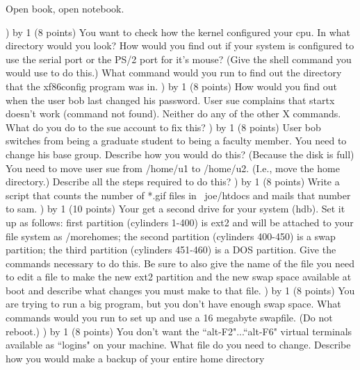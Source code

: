 
\parindent=0in
\nopagenumbers
\newcount\quesno
{}
\def\ques{\number\quesno) \advance\quesno by 1}
\def\aspace{\vskip 1.5in}

Open book, open notebook.

\ques
(8 points)
You want to check how the kernel configured your cpu.
In what directory would you look?
\vskip 0.5in
How would you find out if your system is configured to use
the serial port or the PS/2 port for it's mouse?
(Give the shell command you would use to do this.)  
\vskip 0.5in
What command would you run to find out the directory
that the {\ltt{}xf86config} program was in.
\vskip 0.5in
\ques
(8 points)
How would you find out when the user {\ltt{}bob} last changed his password.
\vskip 0.5in
User {\ltt{}sue} complains that {\ltt{}startx} doesn't work
(command not found). 
Neither do any of the other X commands.
What do you do to the {\ltt{}sue} account to fix this?
\vskip 1.8in
\ques
(8 points)
User {\ltt{}bob} switches from being a graduate student to being 
a faculty member. You need to change his base group.
Describe how you would do this?
\vskip 0.8in
(Because the disk is full)
You need to move user {\ltt{}sue} from {\ltt{}/home/u1} to
{\ltt{}/home/u2}.
(I.e., move the home directory.)
Describe all the steps required to do this?
\vfill\eject
\ques
(8 points)
Write a script that counts the number of {\ltt{}*.gif} files
in {\ltt{}~joe/htdocs} and mails that number to {\ltt{}sam}.
\vskip 2.0in
\ques
(10 points)
Your get a second drive for your system ({\ltt{}hdb}).
Set it up as follows: first partition (cylinders 1-400) is ext2 and
will be attached to your file system as {\ltt{}/morehomes};
the second partition (cylinders 400-450) is a swap partition;
the third partition (cylinders 451-460) is a DOS partition.
Give the commands necessary to do this. 
Be sure to also give the name of the file
you need to edit a file to make the new {\ltt{}ext2} partition
and the new swap space available at boot
and describe what changes you must make to that file.
\vskip 4.0in
\ques
(8 points)
You are trying to run a big program, but you don't have enough swap space.
What commands would you run to set up and use a 16 megabyte swapfile.
(Do not reboot.)
\vfill\eject
\ques
(8 points)
You don't want the ``alt-F2"...``alt-F6" virtual terminals available
as ``logins" on your machine.
What file do you need to change.
\vskip 0.5in
Describe how you would make a backup of your entire {\ltt{}home} directory
